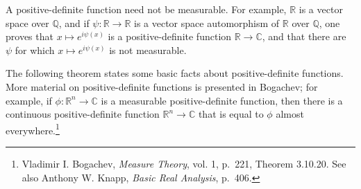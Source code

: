 \documentclass{article}
\theoremstyle{definition}
\theoremstyle{definition}
\begin{document}
A positive-definite function need not be measurable. For example, $\mathbb{R}$ is a vector space over $\mathbb{Q}$,
and if $\psi:\mathbb{R} \to \mathbb{R}$ is a vector space automorphism of $\mathbb{R}$ over $\mathbb{Q}$, one proves that
$x \mapsto e^{i\psi(x)}$ is a positive-definite function $\mathbb{R} \to \mathbb{C}$, and that there are $\psi$
for which $x \mapsto e^{i\psi(x)}$  is not measurable.

The following theorem states some basic facts about positive-definite functions.    
More material on positive-definite functions is presented in Bogachev; for example, 
if $\phi:\mathbb{R}^n \to \mathbb{C}$ is a measurable positive-definite function, then there is a continuous
positive-definite function $\mathbb{R}^n \to \mathbb{C}$ that is equal to $\phi$ almost everywhere.\footnote{Vladimir I. Bogachev, {\em Measure Theory}, vol. 1, p.~221, Theorem 3.10.20. See also Anthony W. Knapp, {\em Basic Real Analysis}, p.~406.}
\end{document}
